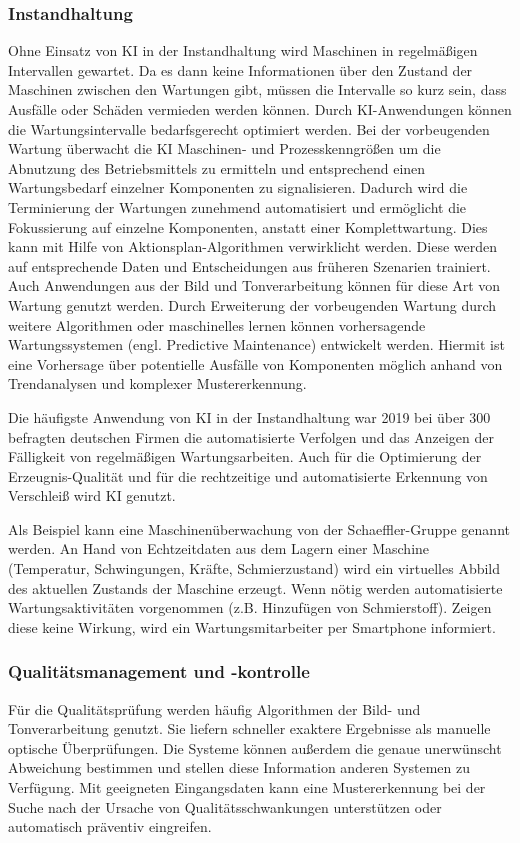 \documentclass[a4paper,12pt, german]{report}
\begin{document}
\subsubsection{Instandhaltung}
Ohne Einsatz von KI in der Instandhaltung wird Maschinen in regelmäßigen Intervallen gewartet. Da es dann keine Informationen über den Zustand der Maschinen zwischen den Wartungen gibt, müssen die Intervalle so kurz sein, dass Ausfälle oder Schäden vermieden werden können. Durch KI-Anwendungen können die Wartungsintervalle bedarfsgerecht optimiert werden. Bei der vorbeugenden Wartung überwacht die KI Maschinen- und Prozesskenngrößen um die Abnutzung des Betriebsmittels zu ermitteln und entsprechend einen Wartungsbedarf einzelner Komponenten zu signalisieren. Dadurch wird die Terminierung der Wartungen zunehmend automatisiert und ermöglicht die Fokussierung auf einzelne Komponenten, anstatt einer Komplettwartung. Dies kann mit Hilfe von Aktionsplan-Algorithmen verwirklicht werden. Diese werden auf entsprechende Daten und Entscheidungen aus früheren Szenarien trainiert. Auch Anwendungen aus der Bild und Tonverarbeitung können für diese Art von Wartung genutzt werden. Durch Erweiterung der vorbeugenden Wartung durch weitere Algorithmen oder maschinelles lernen können vorhersagende Wartungssystemen (engl. Predictive Maintenance)  entwickelt werden. Hiermit ist eine Vorhersage über potentielle Ausfälle von Komponenten möglich anhand von Trendanalysen und komplexer Mustererkennung. \cite{24}

Die häufigste Anwendung von KI in der Instandhaltung war 2019 bei über 300 befragten deutschen Firmen die automatisierte Verfolgen und das Anzeigen der Fälligkeit von regelmäßigen Wartungsarbeiten. Auch für die Optimierung der Erzeugnis-Qualität und für die rechtzeitige und automatisierte Erkennung von Verschleiß wird KI genutzt.\cite{29}

Als Beispiel kann eine Maschinenüberwachung von der Schaeffler-Gruppe genannt werden. An Hand von Echtzeitdaten aus dem Lagern einer Maschine (Temperatur, Schwingungen, Kräfte, Schmierzustand) wird ein virtuelles Abbild des aktuellen Zustands der Maschine erzeugt. Wenn nötig werden automatisierte Wartungsaktivitäten vorgenommen (z.B. Hinzufügen von Schmierstoff). Zeigen diese keine Wirkung, wird ein Wartungsmitarbeiter per Smartphone informiert. \cite{30}

\subsubsection{Qualitätsmanagement und -kontrolle}
Für die Qualitätsprüfung werden häufig Algorithmen der Bild- und Tonverarbeitung genutzt. Sie liefern schneller exaktere Ergebnisse als manuelle optische Überprüfungen. Die Systeme können außerdem die genaue unerwünscht Abweichung bestimmen und stellen diese Information anderen Systemen zu Verfügung. Mit geeigneten Eingangsdaten kann eine Mustererkennung bei der Suche nach der Ursache von Qualitätsschwankungen unterstützen oder automatisch präventiv eingreifen. \cite{24}
\end{document}

